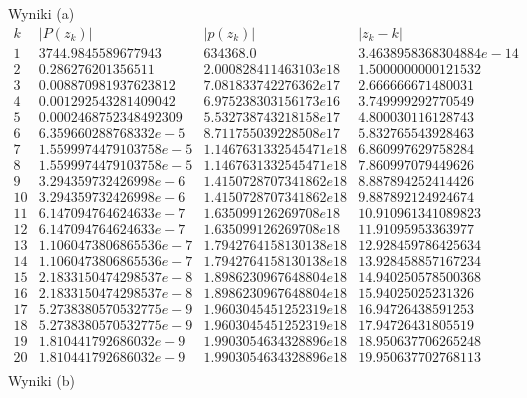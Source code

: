 Wyniki (a)
$$
\begin{array}{c|c|c|c|c}
k & |P(z_k)| & |p(z_k)| & |z_k - k|\\
\hline
1 & 3744.9845589677943 & 634368.0 & 3.4638958368304884e-14\\
2 & 0.286276201356511 & 2.000828411463103e18 & 1.5000000000121532\\
3 & 0.008870981937623812 & 7.081833742276362e17 & 2.666666671480031\\
4 & 0.001292543281409042 & 6.975238303156173e16 & 3.749999292770549\\
5 & 0.0002468752348492309 & 5.532738743218158e17 & 4.800030116128743\\
6 & 6.359660288768332e-5 & 8.711755039228508e17 & 5.832765543928463\\
7 & 1.5599974479103758e-5 & 1.1467631332545471e18 & 6.860997629758284\\
8 & 1.5599974479103758e-5 & 1.1467631332545471e18 & 7.860997079449626\\
9 & 3.294359732426998e-6 & 1.4150728707341862e18 & 8.887894252414426\\
10 & 3.294359732426998e-6 & 1.4150728707341862e18 & 9.887892124924674\\
11 & 6.147094764624633e-7 & 1.635099126269708e18 & 10.910961341089823\\
12 & 6.147094764624633e-7 & 1.635099126269708e18 & 11.91095953363977\\
13 & 1.1060473806865536e-7 & 1.7942764158130138e18 & 12.928459786425634\\
14 & 1.1060473806865536e-7 & 1.7942764158130138e18 & 13.928458857167234\\
15 & 2.1833150474298537e-8 & 1.8986230967648804e18 & 14.940250578500368\\
16 & 2.1833150474298537e-8 & 1.8986230967648804e18 & 15.94025025231326\\
17 & 5.2738380570532775e-9 & 1.9603045451252319e18 & 16.94726438591253\\
18 & 5.2738380570532775e-9 & 1.9603045451252319e18 & 17.94726431805519\\
19 & 1.810441792686032e-9 & 1.9903054634328896e18 & 18.950637706265248\\
20 & 1.810441792686032e-9 & 1.9903054634328896e18 & 19.950637702768113\\
\end{array}
$$
Wyniki (b)
